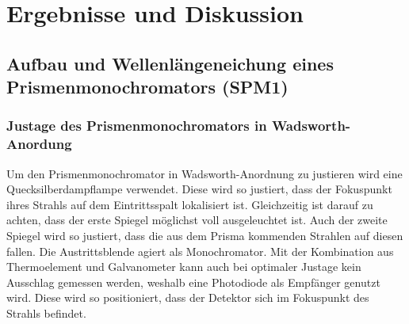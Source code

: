\documentclass[a4paper,twoside,final]{article}
\begin{document}
\section{Ergebnisse und Diskussion}\label{sec:ErgebnisseUndDiskussion}
% 
\subsection{Aufbau und Wellenlängeneichung eines Prismenmonochromators (SPM1)}
\subsubsection{Justage des Prismenmonochromators in Wadsworth-Anordung}
Um den Prismenmonochromator in Wadsworth-Anordnung zu justieren wird eine Quecksilberdampflampe verwendet. Diese wird so justiert, dass der Fokuspunkt ihres Strahls auf dem Eintrittsspalt lokalisiert ist. Gleichzeitig ist darauf zu achten, dass der erste Spiegel möglichst voll ausgeleuchtet ist. Auch der zweite Spiegel wird so justiert, dass die aus dem Prisma kommenden Strahlen auf diesen fallen. Die Austrittsblende agiert als Monochromator. Mit der Kombination aus Thermoelement und Galvanometer kann auch bei optimaler Justage kein Ausschlag gemessen werden, weshalb eine Photodiode als Empfänger genutzt wird. Diese wird so positioniert, dass der Detektor sich im Fokuspunkt des Strahls befindet.
\end{document}
